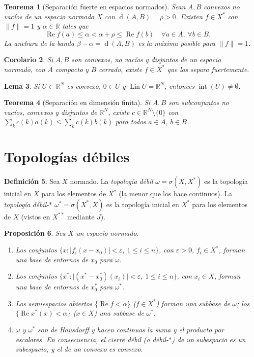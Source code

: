 \documentclass[11pt,a4paper]{article}
\newcommand{\R}{\mathbb{R}}
\newcommand{\norm}[1]{\lVert #1\rVert}
\newcommand{\abs}[1]{\lvert #1\rvert}
\renewcommand{\Re}{\operatorname{Re}}
\newcommand{\Lin}{\operatorname{Lin}}
\newcommand{\inter}{\operatorname{int}}
\newcommand{\dist}{\operatorname{d}}
\theoremstyle{plain}
\newtheorem{teorema}{Teorema}[section]
\newtheorem{lema}[teorema]{Lema}
\newtheorem{proposicion}[teorema]{Proposición}
\newtheorem{corolario}[teorema]{Corolario}
\theoremstyle{definition}
\newtheorem{definicion}[teorema]{Definición}
\theoremstyle{remark}
\begin{document}
\begin{teorema}[Separación fuerte en espacios normados]
Sean $A,B$ convexos no vacíos de un espacio normado $X$ con $\dist(A,B)=\rho>0$. Existen $f\in X^*$ con $\norm f=1$ y $\alpha\in\R$ tales que
\[
\Re f(a)\le\alpha<\alpha+\rho\le\Re f(b)\quad\forall a\in A,\ \forall b\in B.
\]
La anchura de la banda $\beta-\alpha=\dist(A,B)$ es la máxima posible para $\norm f=1$.
\end{teorema}

\begin{corolario}
Si $A,B$ son convexos, no vacíos y disjuntos de un espacio normado, con $A$ compacto y $B$ cerrado, existe $f\in X^*$ que los separa fuertemente.
\end{corolario}

\begin{lema}
Si $U\subset\R^N$ es convexo, $0\in U$ y $\Lin U=\R^N$, entonces $\inter(U)\neq\emptyset$.
\end{lema}

\begin{teorema}[Separación en dimensión finita]
Si $A,B$ son subconjuntos no vacíos, convexos y disjuntos de $\R^N$, existe $c\in\R^N\setminus\{0\}$ con $\sum_k c(k)a(k)\le\sum_k c(k)b(k)$ para todos $a\in A$, $b\in B$.
\end{teorema}

\section{Topologías débiles}

\begin{definicion}
Sea $X$ normado. La \emph{topología débil} $\omega=\sigma(X,X^*)$ es la topología inicial en $X$ para los elementos de $X^*$ (la menor que los hace continuos). La \emph{topología débil-$*$} $\omega^*=\sigma(X^*,X)$ es la topología inicial en $X^*$ para los elementos de $X$ (vistos en $X^{**}$ mediante $J$).
\end{definicion}

\begin{proposicion}
Sea $X$ un espacio normado.
\begin{enumerate}[label=(\alph*)]
\item Los conjuntos $\{x:\abs{f_i(x-x_0)}<\varepsilon,\ 1\le i\le n\}$, con $\varepsilon>0$, $f_i\in X^*$, forman una base de entornos de $x_0$ para $\omega$.
\item Los conjuntos $\{x^*:\abs{(x^*-x_0^*)(x_i)}<\varepsilon,\ 1\le i\le n\}$, con $x_i\in X$, forman una base de entornos de $x_0^*$ para $\omega^*$.
\item Los semiespacios abiertos $\{\Re f<\alpha\}$ ($f\in X^*$) forman una subbase de $\omega$; los $\{\Re x^*(x)<\alpha\}$ ($x\in X$) una subbase de $\omega^*$.
\item $\omega$ y $\omega^*$ son de Hausdorff y hacen continuas la suma y el producto por escalares. En consecuencia, el cierre débil (o débil-$*$) de un subespacio es un subespacio, y el de un convexo es convexo.
\end{enumerate}
\end{proposicion}
\end{document}
